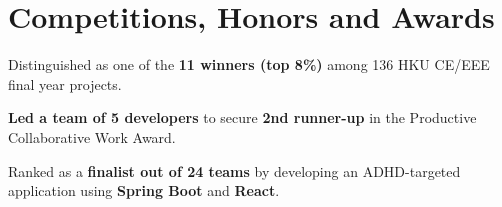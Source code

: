 \documentclass[a4paper,10pt]{article}
\begin{document}
\newcommand{\certificateName}[3]{\textbf{#1} -- #2 [#3]}
\newcommand{\certificateItem}[4]{\certificateName{#1}{#2}{#3} & \href{#4}{\underline{Credential}}\\}
\newenvironment{spacedtabular*}[1]
{\setlength{\extrarowheight}{1pt}\begin{tabular*}{#1}{>{\small}l @{\extracolsep{\fill}} >{\bfseries \small}r}}
    {\end{tabular*}}


\section{Competitions, Honors and Awards}

\begin{tightitemize}
  \item Distinguished as one of the \textbf{11 winners (top 8\%)} among 136 HKU CE/EEE final year projects.
\end{tightitemize}

\begin{tightitemize}
  \item \textbf{Led a team of 5 developers} to secure \textbf{2nd runner-up} in the Productive Collaborative Work Award.
  \item Ranked as a \textbf{finalist out of 24 teams} by developing an ADHD-targeted application using \textbf{Spring Boot} and \textbf{React}.
\end{tightitemize}


\end{document}
